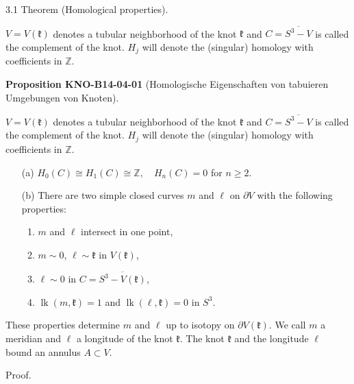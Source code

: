 \documentclass[10pt, letterpaper]{article}
\newcommand{\CustomHeading}[3]{%
  \par\medskip\noindent%
  \textbf{#1 #2} \textnormal{(#3)}.\enskip%
}
\newenvironment{PROP}[2]{\begin{unitbox}\CustomHeading{Proposition}{#1}{#2}}{\end{unitbox}}
\begin{document}
3.1 Theorem (Homological properties).


$V=V(\mathfrak{k})$ denotes a tubular neighborhood of the knot $\mathfrak{k}$ and $C=\overline{S^{3}-V}$ is called the complement of the knot. $H_{j}$ will denote the (singular) homology with coefficients in $\mathbb{Z}$.


\begin{PROP}{KNO-B14-04-01}{Homologische Eigenschaften von tabuieren Umgebungen von Knoten}
$V=V(\mathfrak{k})$ denotes a tubular neighborhood of the knot $\mathfrak{k}$ and $C=\overline{S^{3}-V}$ is called the complement of the knot. $H_{j}$ will denote the (singular) homology with coefficients in $\mathbb{Z}$.

\begin{itemize}
  \item[(a)] \( H_{0}(C) \cong H_{1}(C) \cong \mathbb{Z}, \quad H_{n}(C) = 0 \) for \( n \geq 2 \).
  
  \item[(b)] There are two simple closed curves \( m \) and \( \ell \) on \( \partial V \) with the following properties:
  \begin{enumerate}
    \item \( m \) and \( \ell \) intersect in one point,
    \item \( m \sim 0 \), \( \ell \sim \mathfrak{k} \) in \( V(\mathfrak{k}) \),
    \item \( \ell \sim 0 \) in \( C = \overline{S^{3} - V(\mathfrak{k})} \),
    \item \( \operatorname{lk}(m, \mathfrak{k}) = 1 \) and \( \operatorname{lk}(\ell, \mathfrak{k}) = 0 \) in \( S^{3} \).
  \end{enumerate}
\end{itemize}

These properties determine $m$ and $\ell$ up to isotopy on $\partial V(\mathfrak{k})$. We call $m$ a meridian and $\ell$ a longitude of the knot $\mathfrak{k}$. The knot $\mathfrak{k}$ and the longitude $\ell$ bound an annulus $A \subset V$.
\end{PROP}

Proof. 
\end{document}
